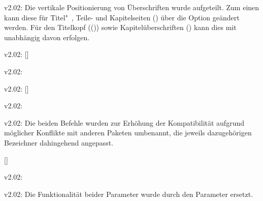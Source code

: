%
\begin{Obsolete}{v2.02:}{}
\printobsoletelist%
%
Die vertikale Positionierung von Überschriften wurde aufgeteilt. Zum einen kann 
diese für Titel"~, Teile- und Kapitelseiten () über 
die Option  geändert werden. Für den Titelkopf
(()) sowie Kapitelüberschriften 
() kann dies mit  unabhängig 
davon erfolgen.
\end{Obsolete}

\begin{Obsolete}{v2.02:}{%
  []%
}
\begin{Obsolete}{v2.02:}{}
\begin{Obsolete}{v2.02:}{%
  []%
}
\begin{Obsolete}{v2.02:}{}
\begin{Obsolete}{v2.02:}{}
\printobsoletelist%
%
Die beiden Befehle wurden zur Erhöhung der Kompatibilität aufgrund möglicher 
Konflikte mit anderen Paketen umbenannt, die jeweils dazugehörigen Bezeichner 
dahingehend angepasst.
\end{Obsolete}
\end{Obsolete}
\end{Obsolete}
\end{Obsolete}
\end{Obsolete}

\begin{Obsolete}{}{[]}
\begin{Obsolete}{v2.02:}{%
}
\begin{Obsolete}{v2.02:}{%
}
\printobsoletelist%
%
Die Funktionalität beider Parameter wurde durch den Parameter 
 ersetzt.
\end{Obsolete}
\end{Obsolete}
\end{Obsolete}



